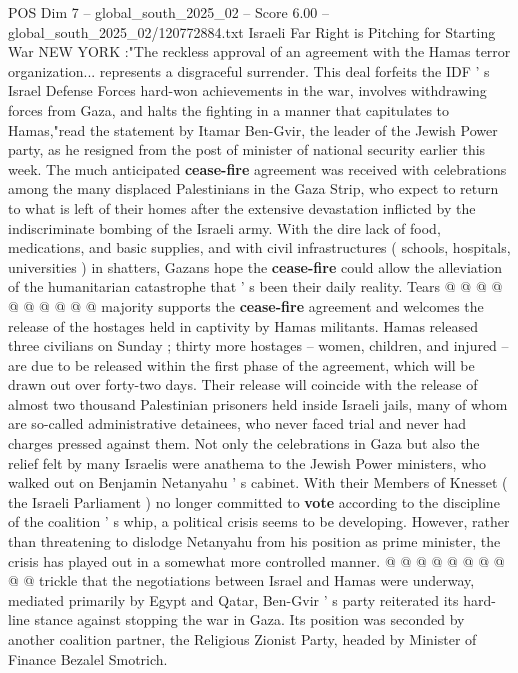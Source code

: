 \begin{textsample}{POS Dim 7 – global\_south\_2025\_02 – Score 6.00 – global\_south\_2025\_02/120772884.txt}  \label{ex:f7_pos_416}
Israeli Far Right is Pitching for Starting War NEW YORK :"The reckless approval of an agreement with the Hamas terror organization... represents a disgraceful surrender.
This deal forfeits the IDF ' s Israel Defense Forces hard-won achievements in the war, involves withdrawing forces from Gaza, and halts the fighting in a manner that capitulates to Hamas,"read the statement by Itamar Ben-Gvir, the leader of the Jewish Power party, as he resigned from the post of minister of national security earlier this week.
The much anticipated \textbf{cease-fire} agreement was received with celebrations among the many displaced Palestinians in the Gaza Strip, who expect to return to what is left of their homes after the extensive devastation inflicted by the indiscriminate bombing of the Israeli army.
With the dire lack of food, medications, and basic supplies, and with civil infrastructures ( schools, hospitals, universities ) in shatters, Gazans hope the \textbf{cease-fire} could allow the alleviation of the humanitarian catastrophe that ' s been their daily reality.
Tears @ @ @ @ @ @ @ @ @ @ majority supports the \textbf{cease-fire} agreement and welcomes the release of the hostages held in captivity by Hamas militants.
Hamas released three civilians on Sunday ; thirty more hostages -- women, children, and injured -- are due to be released within the first phase of the agreement, which will be drawn out over forty-two days.
Their release will coincide with the release of almost two thousand Palestinian prisoners held inside Israeli jails, many of whom are so-called administrative detainees, who never faced trial and never had charges pressed against them.
Not only the celebrations in Gaza but also the relief felt by many Israelis were anathema to the Jewish Power ministers, who walked out on Benjamin Netanyahu ' s cabinet.
With their Members of Knesset ( the Israeli Parliament ) no longer committed to \textbf{vote} according to the discipline of the coalition ' s whip, a political crisis seems to be developing.
However, rather than threatening to dislodge Netanyahu from his position as prime minister, the crisis has played out in a somewhat more controlled manner. @ @ @ @ @ @ @ @ @ @ trickle that the negotiations between Israel and Hamas were underway, mediated primarily by Egypt and Qatar, Ben-Gvir ' s party reiterated its hard-line stance against stopping the war in Gaza.
Its position was seconded by another coalition partner, the Religious Zionist Party, headed by Minister of Finance Bezalel Smotrich.

\end{textsample}
